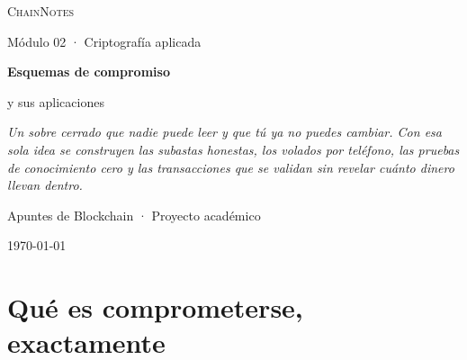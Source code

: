 \documentclass[11pt,a4paper]{article}
\theoremstyle{definition}
\theoremstyle{plain}
\theoremstyle{remark}
\newcommand{\Com}{\mathsf{Com}}
\begin{document}

\makeatletter
\DeclareRobustCommand{\%}{\char`\%\relax}
\makeatother

\begin{titlepage}
\centering
\vspace*{2.5cm}

{\Large\color{violetdeep}\textsc{ChainNotes}\par}
{\small\color{inkc}Módulo 02 · Criptografía aplicada\par}

\vspace{1.4cm}
{\Huge\bfseries Esquemas de compromiso\par}
\vspace{0.4cm}
{\LARGE y sus aplicaciones\par}

\vspace{1.2cm}
\begin{minipage}{0.78\textwidth}
\centering\itshape\color{inkc}
Un sobre cerrado que nadie puede leer y que tú ya no puedes cambiar. Con esa sola
idea se construyen las subastas honestas, los volados por teléfono, las pruebas
de conocimiento cero y las transacciones que se validan sin revelar cuánto dinero
llevan dentro.
\end{minipage}

\vspace{1.6cm}

\vfill
{\small Apuntes de Blockchain · Proyecto académico\par}
{\small\color{inkc}\today\par}
\end{titlepage}

\tableofcontents
\clearpage

\section{Qué es comprometerse, exactamente}
\end{document}
